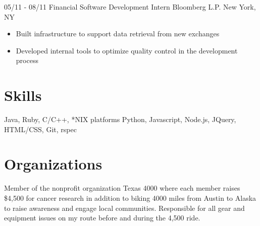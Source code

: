 \documentclass[11pt,letter,sans]{moderncv}
\begin{document}
\cventry
{05/11 - 08/11}
{Financial Software Development Intern}
{Bloomberg L.P.}
{New York, NY}
{}
{
  \begin{itemize}
    \item Built infrastructure to support data retrieval from new exchanges
    \item Developed internal tools to optimize quality control in the
      development process
\end{itemize}}



\section{Skills}
{Java, Ruby, C/C++, *NIX platforms}
{Python, Javascript, Node.js, JQuery, HTML/CSS, Git, rspec}


\section{Organizations}
{Member of the nonprofit organization Texas 4000 where each member raises
\$4,500 for cancer research in addition to biking 4000 miles from Austin to
Alaska to raise awareness and engage local communities. Responsible for all
gear and equipment issues on my route before and during the 4,500 ride. }

\end{document}
